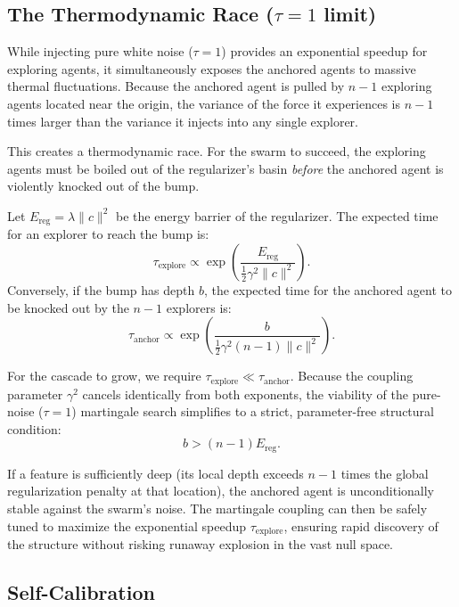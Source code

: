 \documentclass{article}
\begin{document}
\subsection{The Thermodynamic Race ($\tau = 1$ limit)}

While injecting pure white noise ($\tau = 1$) provides an exponential speedup for exploring agents, it simultaneously exposes the anchored agents to massive thermal fluctuations. Because the anchored agent is pulled by $n-1$ exploring agents located near the origin, the variance of the force it experiences is $n-1$ times larger than the variance it injects into any single explorer.

This creates a thermodynamic race. For the swarm to succeed, the exploring agents must be boiled out of the regularizer's basin \emph{before} the anchored agent is violently knocked out of the bump.

Let $E_{\text{reg}} = \lambda \|c\|^2$ be the energy barrier of the regularizer. The expected time for an explorer to reach the bump is:
\begin{equation}
  \tau_{\text{explore}} \propto \exp\left( \frac{E_{\text{reg}}}{\frac{1}{2} \gamma^2 \|c\|^2} \right).
\end{equation}
Conversely, if the bump has depth $b$, the expected time for the anchored agent to be knocked out by the $n-1$ explorers is:
\begin{equation}
  \tau_{\text{anchor}} \propto \exp\left( \frac{b}{\frac{1}{2} \gamma^2 (n-1) \|c\|^2} \right).
\end{equation}

For the cascade to grow, we require $\tau_{\text{explore}} \ll \tau_{\text{anchor}}$. Because the coupling parameter $\gamma^2$ cancels identically from both exponents, the viability of the pure-noise ($\tau=1$) martingale search simplifies to a strict, parameter-free structural condition:
\begin{equation}
  b > (n-1) E_{\text{reg}}.
\end{equation}

If a feature is sufficiently deep (its local depth exceeds $n-1$ times the global regularization penalty at that location), the anchored agent is unconditionally stable against the swarm's noise. The martingale coupling can then be safely tuned to maximize the exponential speedup $\tau_{\text{explore}}$, ensuring rapid discovery of the structure without risking runaway explosion in the vast null space.

\subsection{Self-Calibration}
\end{document}
